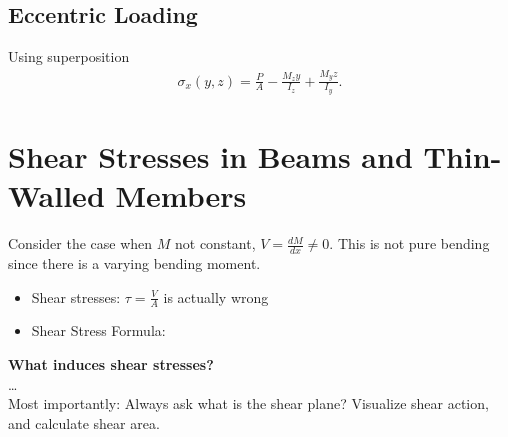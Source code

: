 \documentclass{article}
\numberwithin{equation}{subsection}
\begin{document}
\subsection{Eccentric Loading}
Using superposition
\begin{align*}
  \sigma_x(y,z) = \frac{P}{A} - \frac{M_z y}{I_z} + \frac{M_y z}{I_y}.
\end{align*}

\section{Shear Stresses in Beams and Thin-Walled Members}
Consider the case when $M$ not constant, $V = \frac{dM}{dx} \neq 0$. This is not pure bending since
there is a varying bending moment.
\begin{itemize}
  \item Shear stresses: $\tau = \frac{V}{A}$ is actually wrong
  \item Shear Stress Formula: 
\end{itemize}
\textbf{What induces shear stresses?}\\
\dots \\
Most importantly: Always ask what is the shear plane? Visualize shear action, and
calculate shear area.
\end{document}
